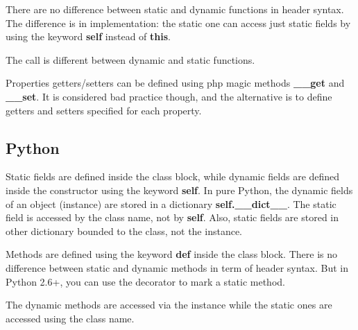 \documentclass{KodeBook}
\begin{document}


There are no difference between static and dynamic functions in header syntax. 
The difference is in implementation: the static one can access just static fields by using the keyword \textbf{self} instead of \textbf{this}.



The call is different between dynamic and static functions.



Properties getters/setters can be defined using php magic methods \textbf{\_\_get} and \textbf{\_\_set}.
It is considered bad practice though, and the alternative is to define getters and setters specified for each property.



\subsection{Python}

Static fields are defined inside the class block, while dynamic fields are defined inside the constructor using the keyword \textbf{self}. 
In pure Python, the dynamic fields of an object (instance) are stored in a dictionary \textbf{self.\_\_dict\_\_}.
The static field is accessed by the class name, not by \textbf{self}.
Also, static fields are stored in other dictionary bounded to the class, not the instance.



Methods are defined using the keyword \textbf{def} inside the class block. 
There is no difference between static and dynamic methods in term of header syntax. 
But in Python 2.6+, you can use the decorator \textbf{\@staticmethod} to mark a static method. 



The dynamic methods are accessed via the instance while the static ones are accessed using the class name.


\end{document}
